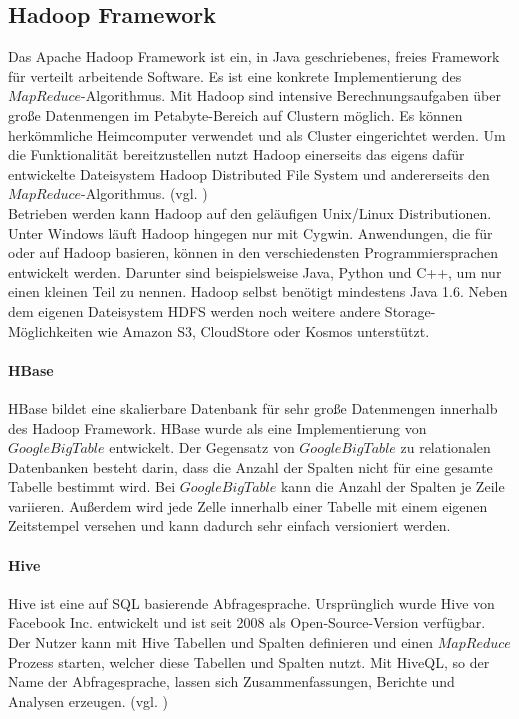 \subsection{Hadoop Framework}
Das Apache Hadoop Framework ist ein, in Java geschriebenes, freies Framework für verteilt arbeitende Software. Es ist eine konkrete Implementierung des $MapReduce$-Algorithmus. Mit Hadoop sind intensive Berechnungsaufgaben über große Datenmengen im Petabyte-Bereich auf Clustern möglich. Es können herkömmliche Heimcomputer verwendet und als Cluster eingerichtet werden. Um die Funktionalität bereitzustellen nutzt Hadoop einerseits das eigens dafür entwickelte Dateisystem Hadoop Distributed File System und andererseits den $MapReduce$-Algorithmus. (vgl. \cite{wik16})\\ Betrieben werden kann Hadoop auf den geläufigen Unix/Linux Distributionen. Unter Windows läuft Hadoop hingegen nur mit Cygwin. Anwendungen, die für oder auf Hadoop basieren, können in den verschiedensten Programmiersprachen entwickelt werden. Darunter sind beispielsweise Java, Python und C++, um nur einen kleinen Teil zu nennen. Hadoop selbst benötigt mindestens Java 1.6. Neben dem eigenen Dateisystem HDFS werden noch weitere andere Storage-Möglichkeiten wie Amazon S3, CloudStore oder Kosmos unterstützt.

\paragraph{HBase}$\;$ \\
HBase bildet eine skalierbare Datenbank für sehr große Datenmengen innerhalb des Hadoop Framework. HBase wurde als eine Implementierung von $Google BigTable$ entwickelt. Der Gegensatz von $Google BigTable$ zu relationalen Datenbanken besteht darin, dass die Anzahl der Spalten nicht für eine gesamte Tabelle bestimmt wird. Bei $Google BigTable$ kann die Anzahl der Spalten je Zeile variieren. Außerdem wird jede Zelle innerhalb einer Tabelle mit einem eigenen Zeitstempel versehen und kann dadurch sehr einfach versioniert werden.

\paragraph{Hive}$\;$ \\
Hive ist eine auf SQL basierende Abfragesprache. Ursprünglich wurde Hive von Facebook Inc. entwickelt und ist seit 2008 als Open-Source-Version verfügbar. Der Nutzer kann mit Hive Tabellen und Spalten definieren und einen $MapReduce$ Prozess starten, welcher diese Tabellen und Spalten nutzt. Mit HiveQL, so der Name der Abfragesprache, lassen sich Zusammenfassungen, Berichte und Analysen erzeugen. (vgl. \cite{bmc10})

